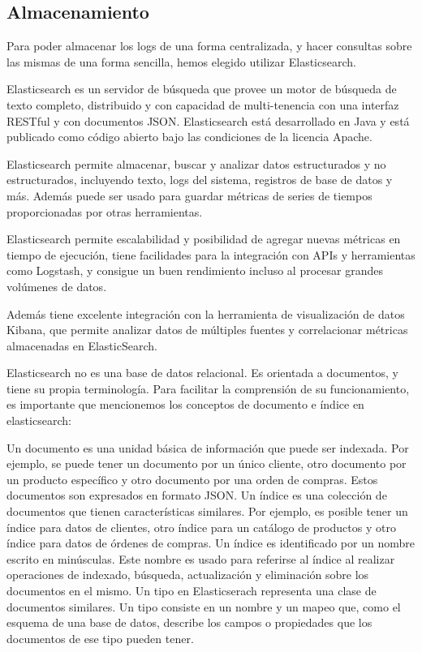 \subsection{Almacenamiento}
\label{almacenamiento}

Para poder almacenar los logs de una forma centralizada, y hacer consultas
sobre las mismas de una forma sencilla, hemos elegido utilizar Elasticsearch.

Elasticsearch es un servidor de búsqueda que provee un motor de búsqueda de
texto completo, distribuido y con capacidad de multi-tenencia con una interfaz
 RESTful y con documentos JSON. Elasticsearch está desarrollado en
Java y está publicado como código abierto bajo las condiciones de la licencia
Apache.

Elasticsearch permite almacenar, buscar y analizar datos estructurados y no
estructurados, incluyendo texto, logs del sistema, registros de base de datos y
más. Además puede ser usado para guardar métricas de series de tiempos
proporcionadas por otras herramientas.

Elasticsearch permite escalabilidad y posibilidad de agregar nuevas métricas en
tiempo de ejecución, tiene facilidades para la integración con APIs y
herramientas como Logstash, y consigue un buen rendimiento incluso al procesar
grandes volúmenes de datos.

Además tiene excelente integración con la herramienta de visualización de datos
Kibana, que permite analizar datos de múltiples fuentes y correlacionar
métricas almacenadas en ElasticSearch.

Elasticsearch no es una base de datos relacional. Es orientada a documentos, y
tiene su propia terminología. Para facilitar la comprensión de su
funcionamiento, es importante que mencionemos los conceptos de documento e
índice en elasticsearch:

Un documento es una unidad básica de información que puede ser indexada. Por
ejemplo, se puede tener un documento por un único cliente, otro documento por
un producto específico y otro documento por una orden de compras. Estos
documentos son expresados en formato JSON.  Un índice es una colección de
documentos que tienen características similares. Por ejemplo, es posible tener
un índice para datos de clientes, otro índice para un catálogo de productos y
otro índice para datos de órdenes de compras. Un índice es identificado por un
nombre escrito en minúsculas. Este nombre es usado para referirse al índice al
realizar operaciones de indexado, búsqueda, actualización y eliminación sobre
los documentos en el mismo.  Un tipo en Elasticserach representa una clase de
documentos similares. Un tipo consiste en un nombre y un mapeo que, como el
esquema de una base de datos, describe los campos o propiedades que los
documentos de ese tipo pueden tener.


